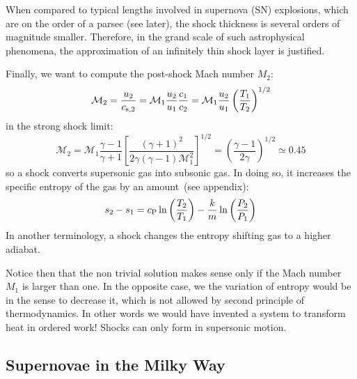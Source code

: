 When compared to typical lengths involved in supernova (SN) explosions, which are on the order of a parsec (see later), the shock thickness is several orders of magnitude smaller. Therefore, in the grand scale of such astrophysical phenomena, the approximation of an infinitely thin shock layer is justified.

Finally, we want to compute the post-shock Mach number \( M_2 \):
%
\begin{equation}
\mathcal M_2 = \frac{u_2}{c_{\rm s,2}} = \mathcal M_1 \frac{u_2}{u_1} \frac{c_1}{c_2} = \mathcal M_1 \frac{u_2}{u_1} \left( \frac{T_1}{T_2} \right)^{1/2}
\end{equation}
%
in the strong shock limit:
%
\begin{equation}
\mathcal M_2 = \mathcal M_1 \frac{\gamma - 1}{\gamma + 1} \left[ \frac{(\gamma + 1)^2}{2\gamma(\gamma - 1) \mathcal M_1^2} \right]^{1/2} = \left( \frac{\gamma - 1}{2\gamma} \right)^{1/2} \simeq 0.45 
\end{equation}
%
so a shock converts supersonic gas into subsonic gas.
%
In doing so, it increases the specific entropy of the gas by an amount~(see appendix):
%
\begin{equation}
s_2 - s_1 = c_{\rm P} \ln \left(\frac{T_2}{T_1}\right) - \frac{k}{m} \ln \left( \frac{P_2}{P_1} \right)
\end{equation}
%
In another terminology, a shock changes the entropy shifting gas to a higher adiabat.

Notice then that the non trivial solution makes sense only if the Mach number $M_1$ is larger than one. In the opposite case, we the variation of entropy would be in the sense to decrease it, which is not allowed by second principle of thermodynamics. 
%
In other words we would have invented a system to transform heat in ordered work! Shocks can only form in supersonic motion.





\subsection{Supernovae in the Milky Way}

